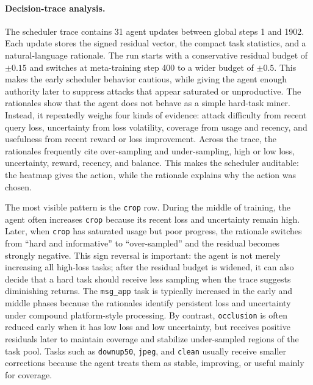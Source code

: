 \paragraph{Decision-trace analysis.}
The scheduler trace contains 31 agent updates between global steps 1 and 1902.
Each update stores the signed residual vector, the compact task statistics, and a natural-language rationale.
The run starts with a conservative residual budget of $\pm 0.15$ and switches at meta-training step 400 to a wider budget of $\pm 0.5$.
This makes the early scheduler behavior cautious, while giving the agent enough authority later to suppress attacks that appear saturated or unproductive.
The rationales show that the agent does not behave as a simple hard-task miner.
Instead, it repeatedly weighs four kinds of evidence: attack difficulty from recent query loss, uncertainty from loss volatility, coverage from usage and recency, and usefulness from recent reward or loss improvement.
Across the trace, the rationales frequently cite over-sampling and under-sampling, high or low loss, uncertainty, reward, recency, and balance.
This makes the scheduler auditable: the heatmap gives the action, while the rationale explains why the action was chosen.

The most visible pattern is the \texttt{crop} row.
During the middle of training, the agent often increases \texttt{crop} because its recent loss and uncertainty remain high.
Later, when \texttt{crop} has saturated usage but poor progress, the rationale switches from ``hard and informative'' to ``over-sampled'' and the residual becomes strongly negative.
This sign reversal is important: the agent is not merely increasing all high-loss tasks; after the residual budget is widened, it can also decide that a hard task should receive less sampling when the trace suggests diminishing returns.
The \texttt{msg\_app} task is typically increased in the early and middle phases because the rationales identify persistent loss and uncertainty under compound platform-style processing.
By contrast, \texttt{occlusion} is often reduced early when it has low loss and low uncertainty, but receives positive residuals later to maintain coverage and stabilize under-sampled regions of the task pool.
Tasks such as \texttt{downup50}, \texttt{jpeg}, and \texttt{clean} usually receive smaller corrections because the agent treats them as stable, improving, or useful mainly for coverage.

